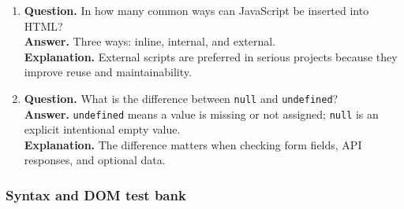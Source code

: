 \documentclass[11pt,a4paper]{article}
\begin{document}
\begin{enumerate}
  \item \textbf{Question.} In how many common ways can JavaScript be inserted into HTML?\\
  \textbf{Answer.} Three ways: inline, internal, and external.\\
  \textbf{Explanation.} External scripts are preferred in serious projects because they improve reuse and maintainability.

  \item \textbf{Question.} What is the difference between \texttt{null} and \texttt{undefined}?\\
  \textbf{Answer.} \texttt{undefined} means a value is missing or not assigned; \texttt{null} is an explicit intentional empty value.\\
  \textbf{Explanation.} The difference matters when checking form fields, API responses, and optional data.
\end{enumerate}

\subsubsection*{Syntax and DOM test bank}
\end{document}
